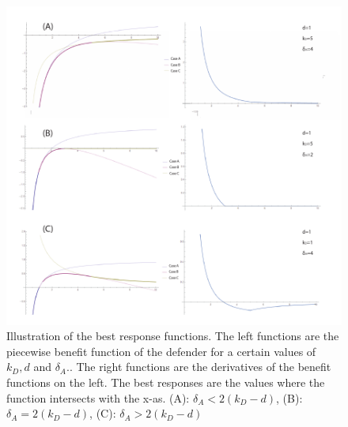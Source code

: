 \begin{figure}[hbtp]
\centering
\includegraphics[scale=1]{Images/case1b.pdf}
\caption{ Illustration of the best response functions. The left functions are the piecewise benefit function of the defender for a certain values of $k_{D},d$ and $\delta_{A}$.. The right functions are the derivatives of the benefit functions on the left. The best responses are the values where the function intersects with the x-as. (A): $\delta_{A} < 2(k_{D}-d)$, (B): $\delta_{A} = 2(k_{D} - d)$, (C): $\delta_{A} > 2(k_{D} - d)$}
\label{case1D}
\end{figure}




